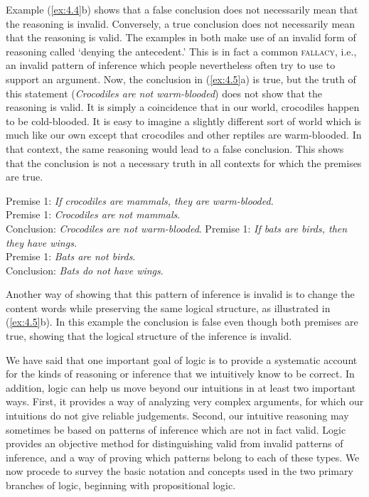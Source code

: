 Example (\ref{ex:4.4}b) shows that a false conclusion does not necessarily mean that the reasoning is invalid. Conversely, a true conclusion does not necessarily mean that the reasoning is valid. The examples in  both make use of an invalid form of reasoning called ‘denying the antecedent.’ This is in fact a common \textsc{fallacy}, i.e., an invalid pattern of inference which people nevertheless often try to use to support an argument. Now, the conclusion in (\ref{ex:4.5}a) is true, but the truth of this statement (\textit{Crocodiles are not warm-blooded}) does not show that the reasoning is valid. It is simply a coincidence that in our world, crocodiles happen to be cold-blooded. It is easy to imagine a slightly different sort of world which is much like our own except that crocodiles and other reptiles are warm-blooded. In that context, the same reasoning would lead to a false conclusion. This shows that the conclusion is not a necessary truth in all contexts for which the premises are true.


\ea \label{ex:4.5}
\ea  Premise 1: \textit{If crocodiles are mammals, they are warm-blooded.\\
}Premise 1: \textit{Crocodiles are not mammals}.\\
\FelixHRule
Conclusion: \textit{Crocodiles are not warm-blooded}.
\ex  Premise 1: \textit{If bats are birds, then they have wings.}\\
Premise 1: \textit{Bats are not birds}.\\
\FelixHRule
Conclusion: \textit{Bats do not have wings}.
\z \z


Another way of showing that this pattern of inference is invalid is to change the content words while preserving the same logical structure, as illustrated in (\ref{ex:4.5}b). In this example the conclusion is false even though both premises are true, showing that the logical structure of the inference is invalid.



We have said that one important goal of logic is to provide a systematic account for the kinds of reasoning or inference that we intuitively know to be correct. In addition, logic can help us move beyond our intuitions in at least two important ways. First, it provides a way of analyzing very complex arguments, for which our intuitions do not give reliable judgements. Second, our intuitive reasoning may sometimes be based on patterns of inference which are not in fact valid. Logic provides an objective method for distinguishing valid from invalid patterns of inference, and a way of proving which patterns belong to each of these types. We now procede to survey the basic notation and concepts used in the two primary branches of logic, beginning with propositional logic.


